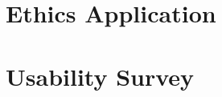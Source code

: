 \documentclass[12pt]{report}
\begin{document}
	\begin{appendix}
		\chapter{Ethics Application}{
			
			\label{app:Ethics}
		}
		\chapter{Usability Survey}{
			
			\label{app:Survey}
		}
	\end{appendix}
\end{document}

